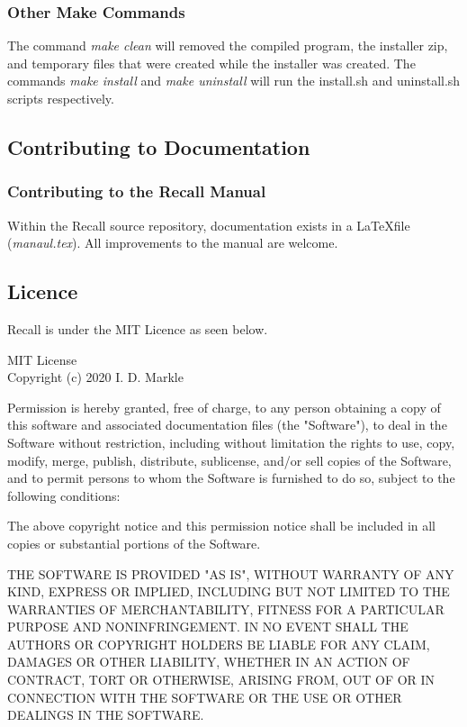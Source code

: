 \documentclass[letterpaper]{article}
\begin{document}
\subsubsection{Other Make Commands}
The command \textit{make clean} will removed the compiled program, the installer zip, and temporary files that were created while the installer was created. The commands \textit{make install} and \textit{make uninstall} will run the install.sh and uninstall.sh scripts respectively.

\subsection{Contributing to Documentation}
\subsubsection{Contributing to the Recall Manual} \label{manual.tex}
Within the Recall source repository, documentation exists in a \LaTeX file (\textit{manaul.tex}). All improvements to the manual are welcome.

\subsection{Licence} \label{licence}
Recall is under the MIT Licence as seen below.\\
\begin{center}
MIT License\\
Copyright (c) 2020 I. D. Markle
\end{center}

Permission is hereby granted, free of charge, to any person obtaining a copy of this software and associated documentation files (the "Software"), to deal in the Software without restriction, including without limitation the rights to use, copy, modify, merge, publish, distribute, sublicense, and/or sell
copies of the Software, and to permit persons to whom the Software is furnished to do so, subject to the following conditions:

The above copyright notice and this permission notice shall be included in all copies or substantial portions of the Software.

THE SOFTWARE IS PROVIDED "AS IS", WITHOUT WARRANTY OF ANY KIND, EXPRESS OR IMPLIED, INCLUDING BUT NOT LIMITED TO THE WARRANTIES OF MERCHANTABILITY, FITNESS FOR A PARTICULAR PURPOSE AND NONINFRINGEMENT. IN NO EVENT SHALL THE AUTHORS OR COPYRIGHT HOLDERS BE LIABLE FOR ANY CLAIM, DAMAGES OR OTHER
LIABILITY, WHETHER IN AN ACTION OF CONTRACT, TORT OR OTHERWISE, ARISING FROM, OUT OF OR IN CONNECTION WITH THE SOFTWARE OR THE USE OR OTHER DEALINGS IN THE SOFTWARE.
\end{document}
